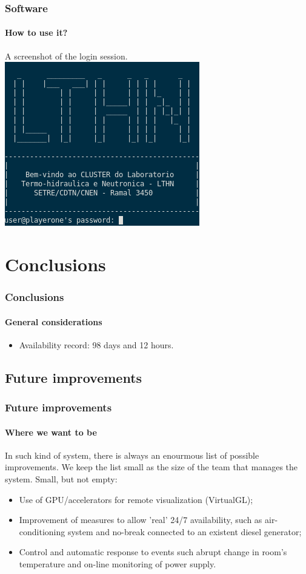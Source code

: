 \documentclass[svgnames,smaller,table]{beamer}
\begin{document}
\begin{frame}
  \frametitle{Software}
  \framesubtitle{How to use it?}
  A screenshot of the login session.\\
  \vspace{10px}
  \centering\includegraphics[scale=0.80]{images/p1login.png}
\end{frame}


\section{Conclusions}
\begin{frame}
  \frametitle{Conclusions}
  \framesubtitle{General considerations}
  \begin{itemize}
  \item Availability record: 98 days and 12 hours.
  \end{itemize}
\end{frame}

\subsection{Future improvements}
\begin{frame}
  \frametitle{Future improvements}
  \framesubtitle{Where we want to be}
  In such kind of system, there is always an enourmous list of possible improvements. We keep the list small as the size of the team that manages the system.
  \vspace{10px}
  Small, but not empty:
  \vspace{10px}
  \begin{itemize}
  \item Use of GPU/accelerators for remote visualization (VirtualGL);
  \item Improvement of measures to allow 'real' 24/7 availability, such as air-conditioning system and no-break connected to an existent diesel generator;
  \item Control and automatic response to events such abrupt change in room's temperature and on-line monitoring of power supply.
  \end{itemize}
  
\end{frame}
\end{document}
